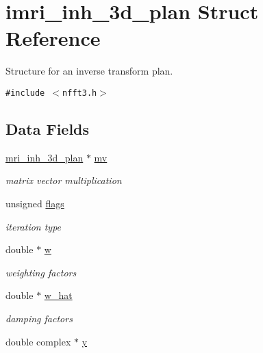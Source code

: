 \hypertarget{structimri__inh__3d__plan}{
\section{imri\_\-inh\_\-3d\_\-plan Struct Reference}
\label{structimri__inh__3d__plan}
}
Structure for an inverse transform plan.  


{\tt \#include $<$nfft3.h$>$}

\subsection*{Data Fields}
\begin{CompactItemize}
\item 
\hypertarget{structimri__inh__3d__plan_o0}{
\hyperlink{structmri__inh__3d__plan}{mri\_\-inh\_\-3d\_\-plan} $\ast$ \hyperlink{structimri__inh__3d__plan_o0}{mv}}
\label{structimri__inh__3d__plan_o0}

\begin{CompactList}\small\item\em matrix vector multiplication \item\end{CompactList}\item 
\hypertarget{structimri__inh__3d__plan_o1}{
unsigned \hyperlink{structimri__inh__3d__plan_o1}{flags}}
\label{structimri__inh__3d__plan_o1}

\begin{CompactList}\small\item\em iteration type \item\end{CompactList}\item 
\hypertarget{structimri__inh__3d__plan_o2}{
double $\ast$ \hyperlink{structimri__inh__3d__plan_o2}{w}}
\label{structimri__inh__3d__plan_o2}

\begin{CompactList}\small\item\em weighting factors \item\end{CompactList}\item 
\hypertarget{structimri__inh__3d__plan_o3}{
double $\ast$ \hyperlink{structimri__inh__3d__plan_o3}{w\_\-hat}}
\label{structimri__inh__3d__plan_o3}

\begin{CompactList}\small\item\em damping factors \item\end{CompactList}\item 
\hypertarget{structimri__inh__3d__plan_o4}{
double complex $\ast$ \hyperlink{structimri__inh__3d__plan_o4}{y}}
\label{structimri__inh__3d__plan_o4}


\end{CompactItemize}
